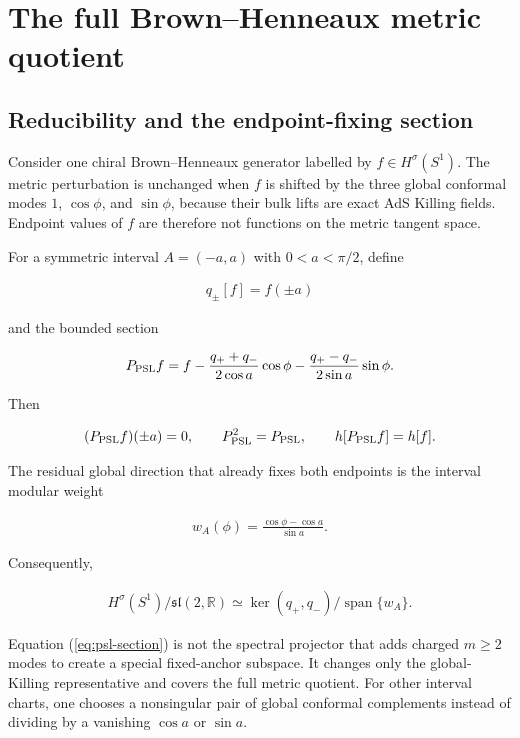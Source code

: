 \section{The full Brown--Henneaux metric quotient}\label{sec:brown-henneaux-theorem}

\subsection{Reducibility and the endpoint-fixing section}\label{subsec:psl-section}

Consider one chiral Brown--Henneaux generator labelled by $f\in H^\sigma(S^1)$. The metric perturbation is unchanged when $f$ is shifted by the three global conformal modes $1$, $\cos\phi$, and $\sin\phi$, because their bulk lifts are exact AdS Killing fields. Endpoint values of $f$ are therefore not functions on the metric tangent space.

For a symmetric interval $A=(-a,a)$ with $0<a<\pi/2$, define

\begin{align}
q_\pm[f]=f(\pm a)
\end{align}

and the bounded section

\begin{align}
P_{\rm PSL}f
=f-\frac{q_++q_-}{2\cos a}\cos\phi
-\frac{q_+-q_-}{2\sin a}\sin\phi . \label{eq:psl-section}
\end{align}

Then

\begin{align}
(P_{\rm PSL}f)(\pm a)=0,
\qquad
P_{\rm PSL}^2=P_{\rm PSL},
\qquad
h[P_{\rm PSL}f]=h[f]. \label{eq:psl-properties}
\end{align}

The residual global direction that already fixes both endpoints is the interval modular weight

\begin{align}
w_A(\phi)=\frac{\cos\phi-\cos a}{\sin a}.
\end{align}

Consequently,

\begin{align}
H^\sigma(S^1)/\mathfrak{sl}(2,\mathbb R)
\simeq
\ker(q_+,q_-)/\operatorname{span}\{w_A\}. \label{eq:quotient-isomorphism}
\end{align}

Equation (\ref{eq:psl-section}) is not the spectral projector that adds charged $m\geq2$ modes to create a special fixed-anchor subspace. It changes only the global-Killing representative and covers the full metric quotient. For other interval charts, one chooses a nonsingular pair of global conformal complements instead of dividing by a vanishing $\cos a$ or $\sin a$.

